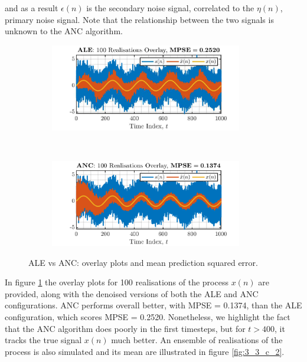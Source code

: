 \begin{enumerate}[label=\alph*), leftmargin=*]
and as a result $\epsilon(n)$ is the secondary noise signal, correlated to the $\eta(n)$, primary noise signal. Note that the relationship between the two signals
is unknown to the ANC algorithm.

\begin{figure}[h]
    \centering
    \begin{subfigure}{0.49\textwidth}
        \centering
        \includegraphics[height=1.5in]{report/adaptive-signal-processing/adaptive-noise-cancellation/assets/c/ALE_overlay}
    \end{subfigure}
    ~
    \begin{subfigure}{0.49\textwidth}
        \centering
        \includegraphics[height=1.5in]{report/adaptive-signal-processing/adaptive-noise-cancellation/assets/c/ANC_overlay}
    \end{subfigure}
    \caption{ALE vs ANC: overlay plots and mean prediction squared error.}
    \label{fig:3_3_c_1}
\end{figure}

In figure \ref{fig:3_3_c_1} the overlay plots for 100 realisations of the process $x(n)$ are provided, along with the denoised versions of both the ALE and ANC configurations.
ANC performs overall better, with MPSE = 0.1374, than the ALE configuration, which scores MPSE = 0.2520. Nonetheless, we highlight the fact that the ANC algorithm
does poorly in the first timesteps, but for $t > 400$, it tracks the true signal $x(n)$ much better. An ensemble of realisations of the process is also simulated and its mean are illustrated in figure \ref{fig:3_3_c_2}.


\end{enumerate}
